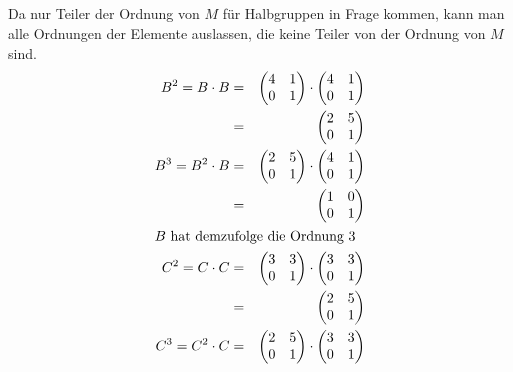 \documentclass[10pt,a4paper,oneside,ngerman,numbers=noenddot]{scrartcl}
\begin{document}
\subsection{} %
Da nur Teiler der Ordnung von $M$ für Halbgruppen in Frage kommen, kann man alle Ordnungen der Elemente auslassen, die keine Teiler von der Ordnung von $M$ sind.
\begin{alignat*}{2}
B^{2} = B \cdot B &=& \begin{pmatrix} 4 & 1 \\ 0 & 1 \end{pmatrix} \cdot \begin{pmatrix} 4 & 1 \\ 0 & 1 \end{pmatrix} \\
&=& \begin{pmatrix} 2 & 5 \\ 0 & 1 \end{pmatrix} \\
B^{3} = B^{2} \cdot B &=& \begin{pmatrix} 2 & 5 \\ 0 & 1 \end{pmatrix} \cdot \begin{pmatrix} 4 & 1 \\ 0 & 1 \end{pmatrix} \\
&=& \begin{pmatrix} 1 & 0 \\ 0 & 1 \end{pmatrix} \\
\intertext{$B$ hat demzufolge die Ordnung $3$}
C^{2} = C \cdot C &=& \begin{pmatrix} 3 & 3 \\ 0 & 1 \end{pmatrix} \cdot \begin{pmatrix} 3 & 3 \\ 0 & 1 \end{pmatrix} \\
&=& \begin{pmatrix} 2 & 5 \\ 0 & 1 \end{pmatrix} \\
C^{3} = C^{2} \cdot C &=& \begin{pmatrix} 2 & 5 \\ 0 & 1 \end{pmatrix} \cdot \begin{pmatrix} 3 & 3 \\ 0 & 1 \end{pmatrix} \\

\end{alignat*}
\end{document}
